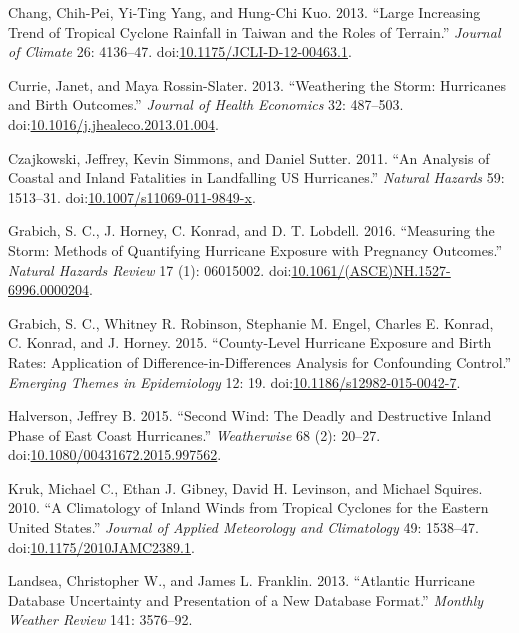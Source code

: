 \documentclass[]{elsarticle} %
\begin{document}
\hypertarget{ref-Chang2013}{}
Chang, Chih-Pei, Yi-Ting Yang, and Hung-Chi Kuo. 2013. ``Large
Increasing Trend of Tropical Cyclone Rainfall in Taiwan and the Roles of
Terrain.'' \emph{Journal of Climate} 26: 4136--47.
doi:\href{https://doi.org/10.1175/JCLI-D-12-00463.1}{10.1175/JCLI-D-12-00463.1}.

\hypertarget{ref-Currie2013}{}
Currie, Janet, and Maya Rossin-Slater. 2013. ``Weathering the Storm:
Hurricanes and Birth Outcomes.'' \emph{Journal of Health Economics} 32:
487--503.
doi:\href{https://doi.org/10.1016/j.jhealeco.2013.01.004}{10.1016/j.jhealeco.2013.01.004}.

\hypertarget{ref-Czajkowski2011}{}
Czajkowski, Jeffrey, Kevin Simmons, and Daniel Sutter. 2011. ``An
Analysis of Coastal and Inland Fatalities in Landfalling US
Hurricanes.'' \emph{Natural Hazards} 59: 1513--31.
doi:\href{https://doi.org/10.1007/s11069-011-9849-x}{10.1007/s11069-011-9849-x}.

\hypertarget{ref-Grabich2016}{}
Grabich, S. C., J. Horney, C. Konrad, and D. T. Lobdell. 2016.
``Measuring the Storm: Methods of Quantifying Hurricane Exposure with
Pregnancy Outcomes.'' \emph{Natural Hazards Review} 17 (1): 06015002.
doi:\href{https://doi.org/10.1061/(ASCE)NH.1527-6996.0000204}{10.1061/(ASCE)NH.1527-6996.0000204}.

\hypertarget{ref-Grabich2015}{}
Grabich, S. C., Whitney R. Robinson, Stephanie M. Engel, Charles E.
Konrad, C. Konrad, and J. Horney. 2015. ``County-Level Hurricane
Exposure and Birth Rates: Application of Difference-in-Differences
Analysis for Confounding Control.'' \emph{Emerging Themes in
Epidemiology} 12: 19.
doi:\href{https://doi.org/10.1186/s12982-015-0042-7}{10.1186/s12982-015-0042-7}.

\hypertarget{ref-Halverson2015}{}
Halverson, Jeffrey B. 2015. ``Second Wind: The Deadly and Destructive
Inland Phase of East Coast Hurricanes.'' \emph{Weatherwise} 68 (2):
20--27.
doi:\href{https://doi.org/10.1080/00431672.2015.997562}{10.1080/00431672.2015.997562}.

\hypertarget{ref-Kruk2010}{}
Kruk, Michael C., Ethan J. Gibney, David H. Levinson, and Michael
Squires. 2010. ``A Climatology of Inland Winds from Tropical Cyclones
for the Eastern United States.'' \emph{Journal of Applied Meteorology
and Climatology} 49: 1538--47.
doi:\href{https://doi.org/10.1175/2010JAMC2389.1}{10.1175/2010JAMC2389.1}.

\hypertarget{ref-Landsea2013}{}
Landsea, Christopher W., and James L. Franklin. 2013. ``Atlantic
Hurricane Database Uncertainty and Presentation of a New Database
Format.'' \emph{Monthly Weather Review} 141: 3576--92.
\end{document}
